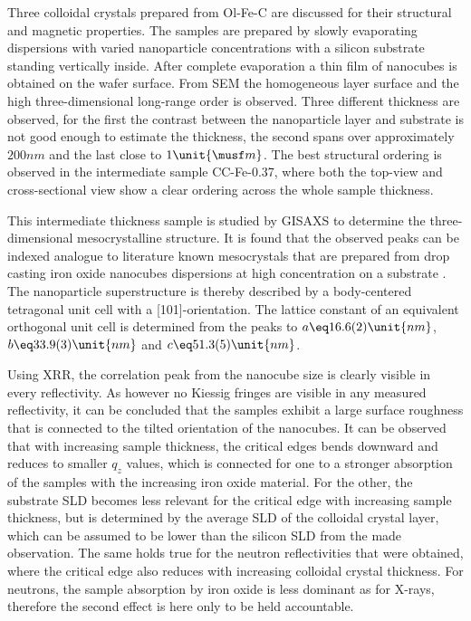 \documentclass[\main/dresen_thesis.tex]{subfiles}
\begin{document}
  \label{sec:colloidalCrystals:colloidalCrystals:summary}
  Three colloidal crystals prepared from Ol-Fe-C are discussed for their structural and magnetic properties.
  The samples are prepared by slowly evaporating dispersions with varied nanoparticle concentrations with a silicon substrate standing vertically inside.
  After complete evaporation a thin film of nanocubes is obtained on the wafer surface.
  From SEM the homogeneous layer surface and the high three-dimensional long-range order is observed.
  Three different thickness are observed, for the first the contrast between the nanoparticle layer and substrate is not good enough to estimate the thickness, the second spans over approximately $200 \unit{nm}$ and the last close to $1 \unit{\musf m}$.
  The best structural ordering is observed in the intermediate sample CC-Fe-0.37, where both the top-view and cross-sectional view show a clear ordering across the whole sample thickness.

  This intermediate thickness sample is studied by GISAXS to determine the three-dimensional mesocrystalline structure.
  It is found that the observed peaks can be indexed analogue to literature known mesocrystals that are prepared from drop casting iron oxide nanocubes dispersions at high concentration on a substrate \cite{Wetterskog_2016_Tunin}.
  The nanoparticle superstructure is thereby described by a body-centered tetragonal unit cell with a [101]-orientation.
  The lattice constant of an equivalent orthogonal unit cell is determined from the peaks to $a \eq 16.6(2) \unit{nm}$, $b\eq 33.9(3) \unit{nm}$ and $c\eq 51.3(5) \unit{nm}$.

  Using XRR, the correlation peak from the nanocube size is clearly visible in every reflectivity.
  As however no Kiessig fringes are visible in any measured reflectivity, it can be concluded that the samples exhibit a large surface roughness that is connected to the tilted orientation of the nanocubes.
  It can be observed that with increasing sample thickness, the critical edges bends downward and reduces to smaller $q_z$ values, which is connected for one to a stronger absorption of the samples with the increasing iron oxide material.
  For the other, the substrate SLD becomes less relevant for the critical edge with increasing sample thickness, but is determined by the average SLD of the colloidal crystal layer, which can be assumed to be lower than the silicon SLD from the made observation.
  The same holds true for the neutron reflectivities that were obtained, where the critical edge also reduces with increasing colloidal crystal thickness.
  For neutrons, the sample absorption by iron oxide is less dominant as for X-rays, therefore the second effect is here only to be held accountable.
  \\
\end{document}
